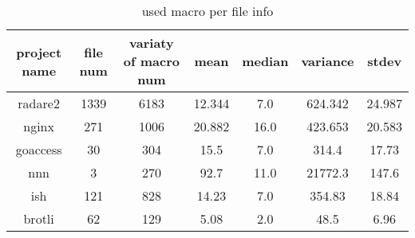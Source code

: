 \begin{table}[h]
	\caption{used macro per file info}
	\label{table:used_macro_info}	
		\begin{tabular}{ccccccc}
		\hline
		project name & file num & variaty of macro num & mean & median & variance & stdev \\ 
		\hline \hline
		radare2 & 1339 & 6183 & 12.344 & 7.0 & 624.342 & 24.987 \\ 
		\hline
		nginx & 271 & 1006 & 20.882 & 16.0 & 423.653 & 20.583 \\ 
		\hline
		goaccess & 30 & 304 & 15.5 & 7.0 & 314.4 & 17.73 \\ 
		\hline
		nnn & 3 & 270 & 92.7 & 11.0 & 21772.3 & 147.6 \\ 
		\hline
		ish & 121 & 828 & 14.23 & 7.0 & 354.83 & 18.84 \\ 
		\hline
		brotli & 62 & 129 & 5.08 & 2.0 & 48.5 & 6.96 \\ 
		\hline
	\end{tabular}
\end{table}